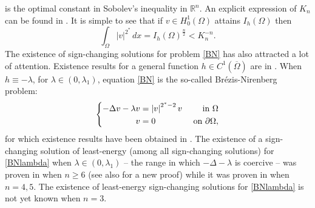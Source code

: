 \documentclass[10pt]{amsart}
\numberwithin{equation}{section}
\newcommand{\R}{\mathbb{R}}
\newcommand{\Om}{\Omega}
\theoremstyle{plain}
\theoremstyle{remark}
\begin{document}
is the optimal constant in Sobolev's inequality in $\R^n$. An explicit expression of $K_n$ can be found in \cite{AubinYamabe, Talenti}. It is simple to see that if $v \in H^1_0(\Om)$ attains $I_h(\Om)$ then 
\begin{equation} \label{thresholdpositive}
\int_{\Om} |v|^{2^*} \, dx = I_h(\Om)^{\frac{n}{2}} < K_n^{-n}.
\end{equation}
The existence of sign-changing solutions for problem  \eqref{BN} has also attracted a lot of attention. Existence results for a general function $h \in C^1(\overline{\Om})$ are in \cite{BartschWeth}. When  $h \equiv - \lambda$, for $ \lambda \in (0, \lambda_1)$, equation \eqref{BN} is the so-called Br\'ezis-Nirenberg problem:
		\begin{equation}\label{BNlambda}
			\left\{\begin{aligned}
						-\Delta v - \lambda v& =\left|v\right|^{2^*-2}v &\hbox{ in } \Omega \\
			v& = 0  &\hbox{ on } \partial \Omega,
		\end{aligned}\right.
	\end{equation}
for which existence results have been obtained in \cite{CeramiFortunatoStruwe, CapozziFortunatoPalmieri, FortunatoJannelli, Solimini,  DevillanovaSolimini, ClappWeth, SchechterZou}. The existence of a sign-changing solution of least-energy (among all sign-changing solutions) for \eqref{BNlambda} when $\lambda \in (0, \lambda_1)$ -- the range in which $- \Delta - \lambda$ is coercive -- was proven in \cite{CeramiSoliminiStruwe} when $n \ge 6$ (see also \cite{ChenZou} for a new proof) while it was proven in \cite{RoselliWillem, TavaresYouZou} when $n=4,5$. The existence of least-energy sign-changing solutions for \eqref{BNlambda} is not yet known when $n=3$.

 
\medskip
\end{document}
